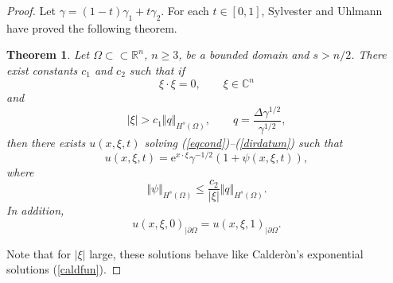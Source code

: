 \documentclass[10pt, a4paper, twoside, openright]{book}
\theoremstyle{definition}
\theoremstyle{plain}
\newtheorem{theorem}[subsection]{Theorem}
\theoremstyle{plain}
\theoremstyle{plain}
\theoremstyle{plain}
\theoremstyle{plain}
\theoremstyle{plain}
\theoremstyle{plain}
\theoremstyle{plain}
\begin{document}
\begin{proof}
Let $\gamma=(1-t)\gamma_1+t\gamma_2$.
For each $t\in[0,1]$, Sylvester and Uhlmann have proved the following theorem.

\begin{theorem}
\label{expgrowsol}
Let $\Omega\subset\subset\mathbb{R}^n$, $n\geq3$, be a bounded domain
and $s>n/2$.
There exist constants $c_1$ and $c_2$ such that if
$$\xi\cdot\xi=0,\qquad\xi\in\mathbb{C}^n$$
and
$$|\xi|>c_1\Vert q\Vert_{H^s(\Omega)},
\qquad q=\frac{\Delta\gamma^{1/2}}{\gamma^{1/2}},$$
then there exists $u(x,\xi,t)$ solving (\ref{eqcond})--(\ref{dirdatum})
such that
\begin{equation}
\label{opticsol}
u(x,\xi,t)=\mathrm{e}^{x\cdot\xi}\gamma^{-1/2}(1+\psi(x,\xi,t)),
\end{equation}
where
\begin{equation}
\label{optics2}
\Vert\psi\Vert_{H^s(\Omega)}\leq\frac{c_2}{|\xi|}
\Vert q\Vert_{H^s(\Omega)}.
\end{equation}
In addition,
\begin{equation}
\label{opt}
u(x,\xi,0)_{|\partial\Omega}=u(x,\xi,1)_{|\partial\Omega}.
\end{equation}
\end{theorem}
Note that for $|\xi|$ large, these solutions behave like Calder\`on's
exponential solutions (\ref{caldfun}).


\end{proof}
\end{document}
